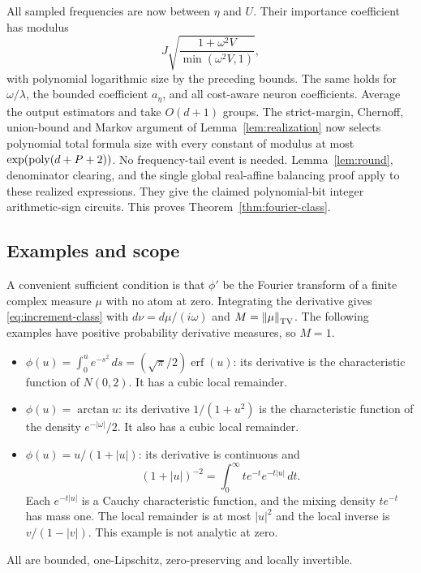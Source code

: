 All sampled frequencies are now between $\eta$ and $U$. Their
importance coefficient has modulus
\[
 J\sqrt{\frac{1+\omega^2V}{\min(\omega^2V,1)}},
\]
with polynomial logarithmic size by the preceding bounds. The same
holds for $\omega/\lambda$, the bounded coefficient $a_\eta$,
and all cost-aware neuron coefficients. Average the output estimators
and take $O(d+1)$ groups. The strict-margin, Chernoff, union-bound and
Markov argument of Lemma~\ref{lem:realization} now selects polynomial
total formula size with every constant of modulus at most
$\exp(\operatorname{poly}(d+P+2))$. No frequency-tail event is needed.
Lemma~\ref{lem:round}, denominator clearing, and the single global
real-affine balancing proof apply to these realized expressions.
They give the claimed polynomial-bit integer arithmetic-sign
circuits. This proves Theorem~\ref{thm:fourier-class}.

\subsection{Examples and scope}

A convenient sufficient condition is that $\phi'$ be the Fourier
transform of a finite complex measure $\mu$ with no atom at zero.
Integrating the derivative gives \eqref{eq:increment-class} with
$d\nu=d\mu/(i\omega)$ and $M=\left\lVert\mu\right\rVert_{\mathrm{TV}}$.
The following examples have positive probability derivative measures,
so $M=1$.
\begin{itemize}
\item $\phi(u)=\int_0^u e^{-s^2}\,ds=(\sqrt\pi/2)\operatorname{erf}(u)$:
its derivative is the characteristic function of $N(0,2)$.
It has a cubic local remainder.
\item $\phi(u)=\arctan u$: its derivative $1/(1+u^2)$ is the
characteristic function of the density $e^{-|\omega|}/2$.
It also has a cubic local remainder.
\item $\phi(u)=u/(1+|u|)$: its derivative is continuous and
\[
 (1+|u|)^{-2}=\int_0^\infty t e^{-t}e^{-t|u|}\,dt.
\]
Each $e^{-t|u|}$ is a Cauchy characteristic function, and the mixing
density $te^{-t}$ has mass one. The local remainder is at most
$|u|^2$ and the local inverse is $v/(1-|v|)$. This example is not
analytic at zero.
\end{itemize}
All are bounded, one-Lipschitz, zero-preserving and locally invertible.

